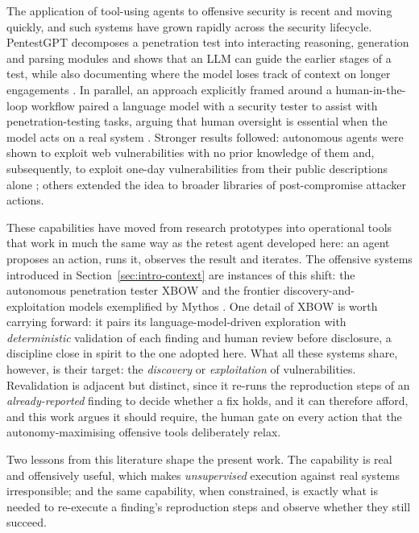 The application of tool-using agents to offensive security is recent and moving
quickly, and such systems have grown rapidly across the security lifecycle.
PentestGPT decomposes a penetration test
into interacting reasoning, generation and parsing modules and shows that an LLM
can guide the earlier stages of a test, while also documenting where the model
loses track of context on longer engagements \cite{deng2024pentestgpt}. In parallel,
an approach explicitly framed around a human-in-the-loop workflow paired a
language model with a security tester to assist with penetration-testing tasks,
arguing that human oversight is essential when the model acts on a real system
\cite{happe2023}. Stronger results followed: autonomous
agents were shown to exploit web vulnerabilities with no prior knowledge of them
and, subsequently, to exploit one-day vulnerabilities from their public descriptions
alone \cite{fang2024oneday}; others extended the idea to broader libraries of
post-compromise attacker actions.

These capabilities have moved from research prototypes into operational tools that
work in much the same way as the retest agent developed here: an agent proposes an
action, runs it, observes the result and iterates. The offensive systems introduced
in Section~\ref{sec:intro-context} are instances of this shift: the autonomous
penetration tester XBOW \cite{xbow} and the frontier discovery-and-exploitation
models exemplified by Mythos \cite{anthropic_mythos, aisi_mythos}. One detail of XBOW is worth carrying
forward: it pairs its language-model-driven exploration with \emph{deterministic}
validation of each finding and human review before disclosure, a discipline close in
spirit to the one adopted here. What all these systems share, however, is their
target: the \emph{discovery} or \emph{exploitation} of vulnerabilities. Revalidation
is adjacent but distinct, since it re-runs the reproduction steps of an
\emph{already-reported} finding to decide whether a fix holds, and it can
therefore afford, and this work argues it should require, the human gate on every
action that the autonomy-maximising offensive tools deliberately relax.

Two lessons from this literature shape the present work. The capability is real and offensively useful, which makes
\emph{unsupervised} execution against real systems irresponsible; and the same
capability, when constrained, is exactly what is needed to re-execute a finding's
reproduction steps and observe whether they still succeed.

